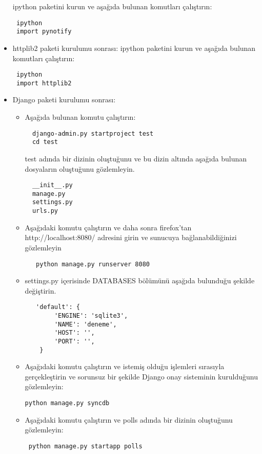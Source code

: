 \documentclass[a4paper,10pt]{article}
\begin{document}
\begin{itemize}
ipython paketini kurun ve aşağıda bulunan komutları çalıştırın:
\begin{verbatim}
 ipython
 import pynotify
\end{verbatim}


\item httplib2 paketi kurulumu sonrası:
ipython paketini kurun ve aşağıda bulunan komutları çalıştırın:
\begin{verbatim}
 ipython
 import httplib2
\end{verbatim}

 \item Django paketi kurulumu sonrası:
\begin{itemize}
 \item Aşağıda bulunan komutu çalıştırın:
 \begin{verbatim}
  django-admin.py startproject test
  cd test
 \end{verbatim}
 test adında bir dizinin oluştuğunu ve bu dizin altında aşağıda bulunan dosyaların oluştuğunu gözlemleyin.
  \begin{verbatim}
  __init__.py
  manage.py
  settings.py
  urls.py 
  \end{verbatim}
 \item Aşağıdaki komutu çalıştırın ve daha sonra firefox'tan http://localhost:8080/ adresini girin ve sunucuya bağlanabildiğinizi gözlemleyin
  \begin{verbatim}
   python manage.py runserver 8080
  \end{verbatim}
 \item settings.py içerisinde DATABASES bölümünü aşağıda bulunduğu şekilde değiştirin. 

  \begin{verbatim}
   'default': {
        'ENGINE': 'sqlite3', 
        'NAME': 'deneme',    
        'HOST': '',          
        'PORT': '',        
    }
  \end{verbatim}
\item Aşağıdaki komutu çalıştırın ve istemiş olduğu işlemleri sırasıyla gerçekleştirin ve sorunsuz bir şekilde Django onay sisteminin kurulduğunu gözlemleyin:
\begin{verbatim}
python manage.py syncdb 
\end{verbatim}
\item Aşağıdaki komutu çalıştırın ve polls adında bir dizinin oluştuğunu gözlemleyin:
\begin{verbatim}
 python manage.py startapp polls 
\end{verbatim}


\end{itemize}
\end{itemize}
\end{document}
